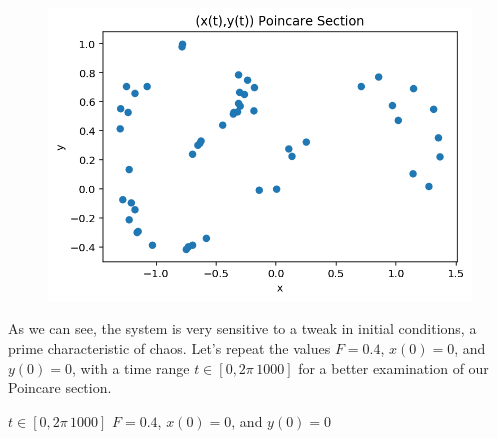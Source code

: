 \documentclass{article}
\begin{document}
\begin{figure}[h!]
\includegraphics[scale=0.4]{poincare7.png}
\end{figure}

As we can see, the system is very sensitive to a tweak in initial conditions, a prime characteristic of chaos. Let's repeat the values $F = 0.4$, $x(0) = 0$, and $y(0) = 0$, with a time range $t\in[0,2\pi\, 1000]$ for a better examination of our Poincare section.

$t\in[0,2\pi\, 1000]$
$F = 0.4$, $x(0) = 0$, and $y(0) = 0$
\end{document}
